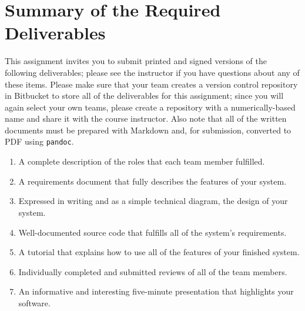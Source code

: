 
\section*{Summary of the Required Deliverables}

This assignment invites you to submit printed and signed versions of the following deliverables; please see the
instructor if you have questions about any of these items. Please make sure that your team creates a version control
repository in Bitbucket to store all of the deliverables for this assignment; since you will again select your own
teams, please create a repository with a numerically-based name and share it with the course instructor. Also note that
all of the written documents must be prepared with Markdown and, for submission, converted to PDF using {\tt pandoc}.

\vspace*{-.1in}
\begin{enumerate}
  \setlength{\itemsep}{0in}
  \item A complete description of the roles that each team member fulfilled.
  \item A requirements document that fully describes the features of your system.
  \item Expressed in writing and as a simple technical diagram, the design of your system.
  \item Well-documented source code that fulfills all of the system's requirements.
  \item A tutorial that explains how to use all of the features of your finished system.
  \item Individually completed and submitted reviews of all of the team members.
  \item An informative and interesting five-minute presentation that highlights your software.
\end{enumerate}
\vspace*{-.1in}



